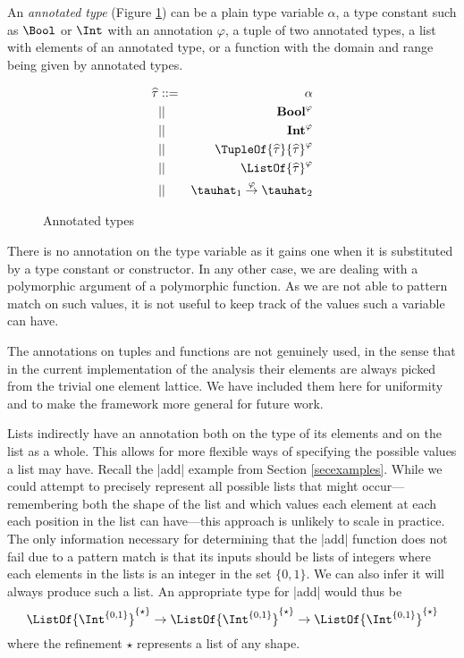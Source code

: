 An \emph{annotated type} (Figure \ref{AnnotatedTypes}) can be a plain type variable $\alpha$, a type constant such as $\Bool$ or $\Int$ with an annotation $\varphi$, a tuple of two annotated types, a list with elements of an annotated type, or a function with the domain and range being given by annotated types.

\begin{figure}[h!t]
\begin{eqnarray*}
\widehat\tau &::=& \alpha                                       \\
             &||&  \textbf{Bool}^\varphi                        \\
             &||&  \textbf{Int}^\varphi                         \\
             &||&  \TupleOf{\widehat\tau}{\widehat\tau}^\varphi \\
             &||&  \ListOf{\widehat\tau}^\varphi                \\
             &||&  \tauhat_1 \overset{\varphi}{\to} \tauhat_2
\end{eqnarray*}
\caption{Annotated types}
\label{AnnotatedTypes}
\end{figure}

There is no annotation on the type variable as it gains one when it is substituted by a type constant or constructor. In any other case, we are dealing with a polymorphic argument of a polymorphic function. As we are not able to pattern match on such values, it is not useful to keep track of the values such a variable can have.

The annotations on tuples and functions are not genuinely used, in the sense that in the current implementation of the analysis their elements are always picked from the trivial one element lattice. We have included them here for uniformity and to make the framework more general for future work.

Lists indirectly have an annotation both on the type of its elements and on the list as a whole. This allows for more flexible ways of specifying the possible values a list may have. Recall the |add| example from Section \ref{secexamples}. While we could attempt to precisely represent all possible lists that might occur---remembering both the shape of the list and which values each element at each each position in the list can have---this approach is unlikely to scale in practice. The only information necessary for determining that the |add| function does not fail due to a pattern match is that its inputs should be lists of integers where each elements in the lists is an integer in the set $\{0, 1\}$. We can also infer it will always produce such a list. An appropriate type for |add| would thus be \[\ListOf{\Int^{\{0, 1\}}}^{\{\star\}} \to \ListOf{\Int^{\{0, 1\}}}^{\{\star\}} \to \ListOf{\Int^{\{0, 1\}}}^{\{\star\}}\]
where the refinement $\star$ represents a list of any shape.

